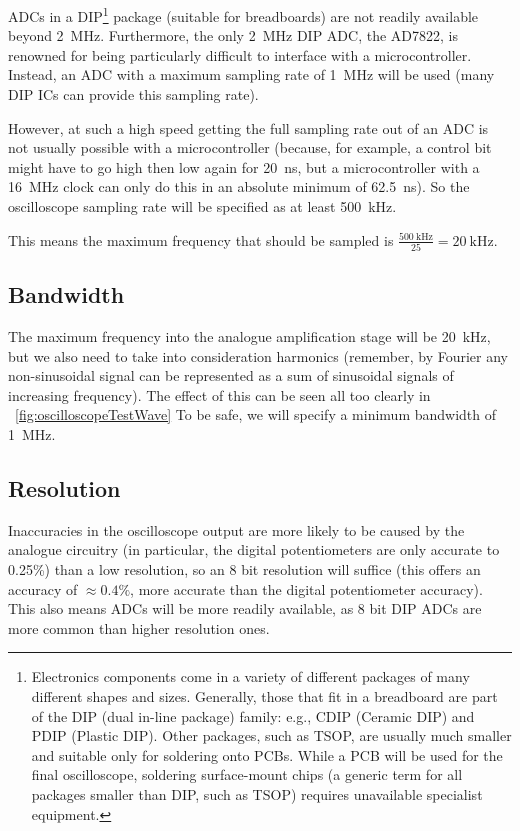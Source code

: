 ADCs in a DIP\footnote{Electronics components come in a variety of different
packages of many different shapes and sizes. Generally, those that fit in a
breadboard are part of the DIP (dual in-line package) family: e.g., CDIP
(Ceramic DIP) and PDIP (Plastic DIP). Other packages, such as TSOP, are usually
much smaller and suitable only for soldering onto PCBs. While a PCB will be used
for the final oscilloscope, soldering surface-mount chips (a generic term for
all packages smaller than DIP, such as TSOP) requires unavailable specialist
equipment.} package (suitable for breadboards) are not readily available beyond
\SI{2}{\MHz}. Furthermore, the only \SI{2}{\MHz} DIP ADC, the AD7822, is
renowned for being particularly difficult to interface with a microcontroller.
Instead, an ADC with a maximum sampling rate of \SI{1}{\MHz} will be used (many
DIP ICs can provide this sampling rate).

However, at such a high speed getting the full sampling rate out of an ADC is
not usually possible with a microcontroller (because, for example, a control bit
might have to go high then low again for \SI{20}{\ns}, but a microcontroller
with a \SI{16}{\MHz} clock can only do this in an absolute minimum of
\SI{62.5}{\ns}). So the oscilloscope sampling rate will be specified as at least
\SI{500}{\kHz}.

This means the maximum frequency that should be sampled is
$\frac{\SI{500}{\kHz}}{25} = \SI{20}{\kHz}$.

\subsection*{Bandwidth}

The maximum frequency into the analogue amplification stage will be
\SI{20}{\kHz}, but we also need to take into consideration harmonics (remember,
by Fourier any non-sinusoidal signal can be represented as a sum of sinusoidal
signals of increasing frequency). The effect of this can be seen all too clearly
in ~\cref{fig:oscilloscopeTestWave} To be safe, we will specify a minimum
bandwidth of \SI{1}{\MHz}.

\subsection*{Resolution}

Inaccuracies in the oscilloscope output are more likely to be caused by the
analogue circuitry (in particular, the digital potentiometers are only accurate
to 0.25\%) than a low resolution, so an 8 bit resolution will suffice (this
offers an accuracy of $\approx 0.4\%$, more accurate than the digital
potentiometer accuracy). This also means ADCs will be more readily available, as
8 bit DIP ADCs are more common than higher resolution ones.

